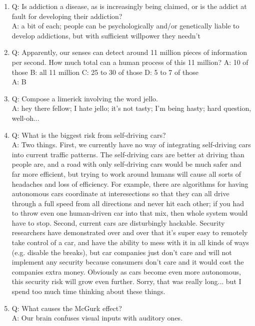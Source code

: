 \begin{enumerate}

\item Q: Is addiction a disease, as is increasingly being claimed, or is the addict at fault for developing their addiction?
\\ A: a bit of each; people can be psychologically and/or genetically liable to develop addictions, but with sufficient willpower they needn't

\item Q: Apparently, our senses can detect around 11 million pieces of information per second. How much total can a human process of this 11 million? A: 10 of those B: all 11 million C: 25 to 30 of those D: 5 to 7 of those
\\ A: B

\item Q: Compose a limerick involving the word jello.
\\ A: hey there fellow; I hate jello; it's not tasty; I'm being hasty; hard question, well-oh...

\item Q: What is the biggest risk from self-driving cars?
\\ A: Two things.  First, we currently have no way of integrating self-driving cars into current traffic patterns.  The self-driving cars are better at driving than people are, and a road with only self-driving cars would be much safer and far more efficient, but trying to work around humans will cause all sorts of headaches and loss of efficiency.  For example, there are algorithms for having autonomous cars coordinate at interesections so that they can all drive through a full speed from all directions and never hit each other; if you had to throw even one human-driven car into that mix, then whole system would have to stop.  Second, current cars are disturbingly hackable.  Security researchers have demonstrated over and over that it's super easy to remotely take control of a car, and have the ability to mess with it in all kinds of ways (e.g. disable the breaks), but car companies just don't care and will not implement any security because consumers don't care and it would cost the companies extra money.  Obviously as cars become even more autonomous, this security risk will grow even further.  Sorry, that was really long... but I spend too much time thinking about these things.

\item Q: What causes the McGurk effect?
\\ A: Our brain confuses visual inputs with auditory ones.


\end{enumerate}
